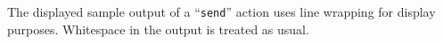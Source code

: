 
    The displayed sample output of a ``\texttt{send}'' action uses line wrapping for display purposes.
    Whitespace in the output is treated as usual.
